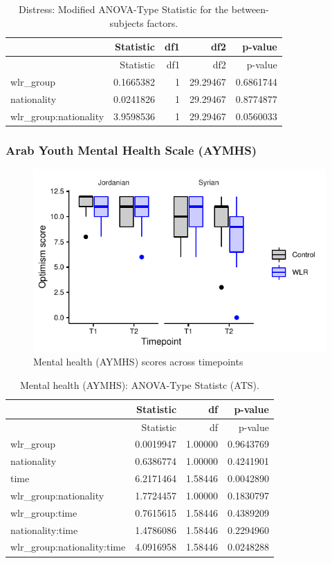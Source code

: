 \documentclass[]{article}
\begin{document}
\begin{longtable}[]{@{}lrrrr@{}}
\caption{Distress: Modified ANOVA-Type Statistic for the
between-subjects factors.}\tabularnewline
\toprule
& Statistic & df1 & df2 & p-value\tabularnewline
\midrule
\endfirsthead
\toprule
& Statistic & df1 & df2 & p-value\tabularnewline
\midrule
\endhead
wlr\_group & 0.1665382 & 1 & 29.29467 & 0.6861744\tabularnewline
nationality & 0.0241826 & 1 & 29.29467 & 0.8774877\tabularnewline
wlr\_group:nationality & 3.9598536 & 1 & 29.29467 &
0.0560033\tabularnewline
\bottomrule
\end{longtable}

\newpage

\hypertarget{arab-youth-mental-health-scale-aymhs}{%
\subsubsection{Arab Youth Mental Health Scale
(AYMHS)}\label{arab-youth-mental-health-scale-aymhs}}

\begin{figure}[H]

{\centering \includegraphics{WLR-analyses-report_files/figure-latex/unnamed-chunk-28-1} 

}

\caption{Mental health (AYMHS) scores across timepoints}\label{fig:unnamed-chunk-28}
\end{figure}

\begin{longtable}[]{@{}lrrr@{}}
\caption{Mental health (AYMHS): ANOVA-Type Statistc
(ATS).}\tabularnewline
\toprule
& Statistic & df & p-value\tabularnewline
\midrule
\endfirsthead
\toprule
& Statistic & df & p-value\tabularnewline
\midrule
\endhead
wlr\_group & 0.0019947 & 1.00000 & 0.9643769\tabularnewline
nationality & 0.6386774 & 1.00000 & 0.4241901\tabularnewline
time & 6.2171464 & 1.58446 & 0.0042890\tabularnewline
wlr\_group:nationality & 1.7724457 & 1.00000 & 0.1830797\tabularnewline
wlr\_group:time & 0.7615615 & 1.58446 & 0.4389209\tabularnewline
nationality:time & 1.4786086 & 1.58446 & 0.2294960\tabularnewline
wlr\_group:nationality:time & 4.0916958 & 1.58446 &
0.0248288\tabularnewline
\bottomrule
\end{longtable}
\end{document}

